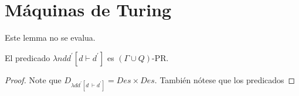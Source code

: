 \section{Máquinas de Turing}

  \begin{lemma}
    \PN Este lemma no se evalua.
  \end{lemma}

  \begin{lemma}
  	\PN El predicado $\lambda ndd^{\prime} \left[d \vdash d^{\prime}\right]$ es $(\Gamma \cup Q)$-PR.
  \end{lemma}
	\begin{proof}
	  Note que $D_{\lambda dd^{\prime}\left[d\ \vdash d^{\prime }\right] }=Des\times Des$.
    También nótese que los predicados


\end{proof}
